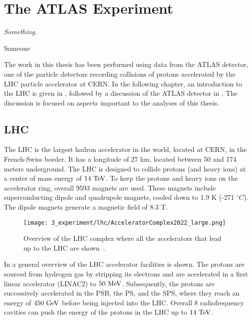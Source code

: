 \chapter{The ATLAS Experiment}
\label{ch:atlas}

\epigraph{\emph{Something.}}{Someone}

The work in this thesis has been performed using data from the \ac{ATLAS} detector, one of the particle detectors recording collisions of protons accelerated by the \ac{LHC} particle accelerator at \ac{CERN}. 
In the following chapter, an introduction to the \ac{LHC} is given in \Sect{\ref{sec:atlas:LHC}}, followed by a discussion of the \ac{ATLAS} detector in \Sect{\ref{sec:atlas:atlas}}. The discussion is focused on aspects important to the analyses of this thesis.







\section{LHC}
\label{sec:atlas:LHC}

The \ac{LHC} \cite{LHCTDR,LHCMachine} is the largest hadron accelerator in the world, located at \ac{CERN}, in the French-Swiss border. It has a longitude of 27 km, located between 50 and 174 meters underground.
The \ac{LHC} is designed to collide protons (and heavy ions) at a center of mass energy of \(14~\text{TeV}\). To keep the protons and heavy ions on the accelerator ring, overall 9593 magnets are used. These magnets include superconducting dipole and quadrupole magnets, cooled down to 1.9 K (-271 $^{\circ} C$). The dipole magnets generate a magnetic field of 8.3 T.

\begin{figure}[ht!]
    \centering
    \texttt{[image: 3\_experiment/lhc/AcceleratorComplex2022\_large.png]}
    \caption{Overview of the \ac{LHC} complex where all the accelerators that lead up to the \ac{LHC} are shown~\cite{LHC-complex}.}
    \label{fig:atlas:lhc:lhc}
\end{figure}

In \Fig{\ref{fig:atlas:lhc:lhc}} a general overview of the \ac{LHC} accelerator facilities is shown. The protons are sourced from hydrogen gas by stripping its electrons and are accelerated in a first linear accelerator (LINAC2) to \(50~\text{MeV}\). Subsequently, the protons are successively accelerated in the \ac{PSB}, the \ac{PS}, and the \ac{SPS}, where they reach an energy of \(450~\text{GeV}\) before being injected into the \ac{LHC}.  Overall 8 radiofrequency cavities can push the energy of the protons in the \ac{LHC} up to \(14~\text{TeV}\).


